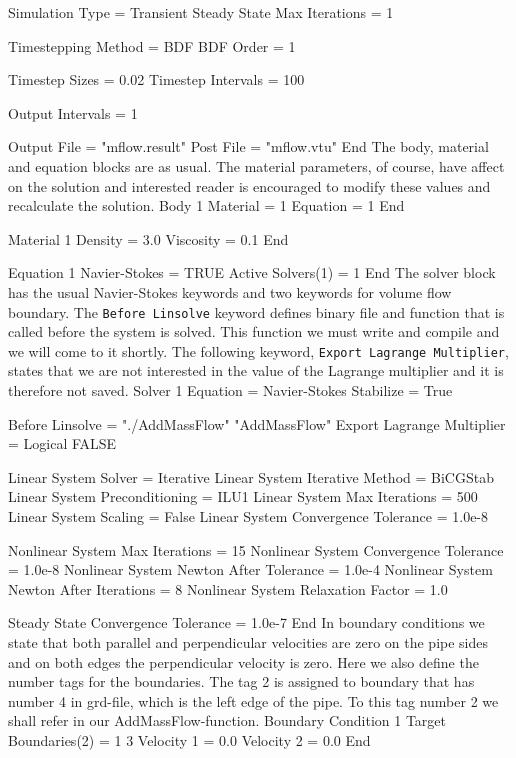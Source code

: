   Simulation Type = Transient
  Steady State Max Iterations = 1

  Timestepping Method = BDF
  BDF Order = 1

  Timestep Sizes = 0.02
  Timestep Intervals = 100

  Output Intervals = 1

  Output File = "mflow.result"
  Post File = "mflow.vtu"
End
\ttend
The body, material and equation blocks are as usual. The material parameters,
of course, have affect on the solution and interested reader is encouraged to
modify these values and recalculate the solution.
\ttbegin
Body 1
  Material = 1
  Equation = 1
End

Material 1
  Density = 3.0
  Viscosity = 0.1
End

Equation 1
  Navier-Stokes = TRUE
  Active Solvers(1) = 1
End
\ttend
The solver block has the usual Navier-Stokes keywords and two keywords
for volume flow boundary. 
The {\tt Before Linsolve} keyword defines binary file and function that is
called before the system is solved. This function we must write and
compile and we will come to it shortly. The following keyword,
{\tt Export Lagrange Multiplier}, states that we are not interested in 
the value of the Lagrange multiplier and it is therefore not saved.
\ttbegin
Solver 1
  Equation = Navier-Stokes
  Stabilize = True

  Before Linsolve = "./AddMassFlow" "AddMassFlow"
  Export Lagrange Multiplier = Logical FALSE

  Linear System Solver = Iterative
  Linear System Iterative Method = BiCGStab
  Linear System Preconditioning = ILU1
  Linear System Max Iterations = 500
  Linear System Scaling = False
  Linear System Convergence Tolerance = 1.0e-8

  Nonlinear System Max Iterations = 15
  Nonlinear System Convergence Tolerance = 1.0e-8
  Nonlinear System Newton After Tolerance = 1.0e-4
  Nonlinear System Newton After Iterations = 8
  Nonlinear System Relaxation Factor = 1.0

  Steady State Convergence Tolerance = 1.0e-7
End
\ttend
In boundary conditions we state that both parallel and perpendicular velocities
are zero on the pipe sides and on both edges the perpendicular velocity is zero.
Here we also define the number tags for the boundaries. The tag 2 is assigned to
boundary that has number 4 in grd-file, which is the left edge of the pipe.
To this tag number 2 we shall refer in our AddMassFlow-function.
\ttbegin
Boundary Condition 1
  Target Boundaries(2) = 1 3
  Velocity 1 = 0.0
  Velocity 2 = 0.0
End

